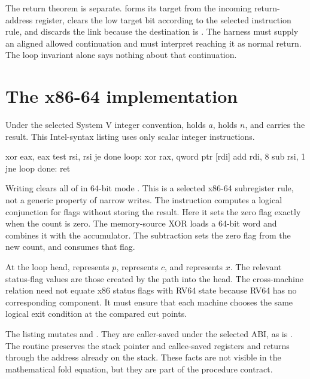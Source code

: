 The return theorem is separate.  forms its target from the
incoming return-address register, clears the low target bit according to the
selected instruction rule, and discards the link because the destination is
. The harness must supply an aligned allowed continuation and must
interpret reaching it as normal return. The loop invariant alone says nothing
about that continuation.

\section{The x86-64 implementation}

Under the selected System V integer convention,  holds \(a\),
 holds \(n\), and  carries the result. This Intel-syntax
listing uses only scalar integer instructions.

\begin{codelisting}[language={},caption={x86-64 XOR reduction}]
    xor  eax, eax
    test rsi, rsi
    je   done
loop:
    xor  rax, qword ptr [rdi]
    add  rdi, 8
    sub  rsi, 1
    jne  loop
done:
    ret
\end{codelisting}

Writing  clears all of  in 64-bit mode
\autocite{intel2026sdm1}. This is a selected
x86-64 subregister rule, not a generic property of narrow writes. The
 instruction computes a logical conjunction for flags without
storing the result. Here it sets the zero flag exactly when the count is zero.
The memory-source XOR loads a 64-bit word and combines it with the accumulator.
The subtraction sets the zero flag from the new count, and  consumes
that flag.

At the loop head,  represents \(p\),  represents \(c\),
and  represents \(x\). The relevant status-flag values are those
created by the path into the head. The cross-machine relation need not equate
x86 status flags with RV64 state because RV64 has no corresponding component.
It must ensure that each machine chooses the same logical exit condition at
the compared cut points.

The listing mutates  and . They are caller-saved under the
selected ABI, as is . The routine preserves the stack pointer and
callee-saved registers and returns through the address already on the stack.
These facts are not visible in the mathematical fold equation, but they are
part of the procedure contract.

